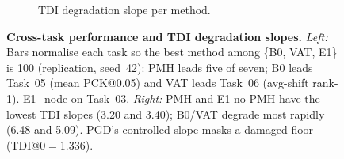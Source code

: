 \begin{figure}[t]
\begin{subfigure}[b]{0.46\textwidth}
\caption{TDI degradation slope per method.}
\end{subfigure}
\caption{\textbf{Cross-task performance and TDI degradation slopes.}
\emph{Left:} Bars normalise each task so the best method among \{B0, VAT, E1\} is 100
(replication, seed~42): PMH leads five of seven; B0 leads Task~05 (mean PCK@0.05)
and VAT leads Task~06 (avg-shift rank-1). E1\_node on Task~03.
\emph{Right:} PMH and E1 no PMH have the lowest TDI slopes (3.20 and 3.40);
B0/VAT degrade most rapidly (6.48 and 5.09).
PGD's controlled slope masks a damaged floor (TDI@0$=$1.336).}
\label{fig:a1}
\end{figure}

